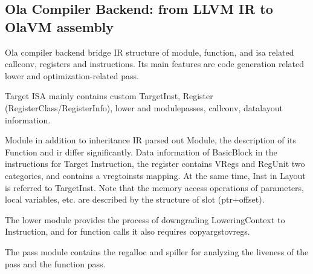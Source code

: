 \subsection{Ola Compiler Backend: from LLVM IR to OlaVM assembly}

Ola compiler backend bridge IR structure of module, function, and isa related callconv, registers and instructions.
Its main features are code generation related lower and optimization-related pass.

Target ISA mainly contains custom TargetInst, Register (RegisterClass/RegisterInfo), lower and modulepasses, callconv, datalayout information.

Module in addition to inheritance IR parsed out Module, the description of its Function and ir differ significantly.
Data information of BasicBlock in the instructions for Target Instruction, the register contains VRegs and RegUnit two categories, and contains a vregtoinsts mapping.
At the same time, Inst in Layout is referred to TargetInst. Note that the memory access operations of parameters, local variables, etc. are described by the structure of slot (ptr+offset).

The lower module provides the process of downgrading LoweringContext to Instruction, and for function calls it also requires copyargstovregs.

The pass module contains the regalloc and spiller for analyzing the liveness of the pass and the function pass.










